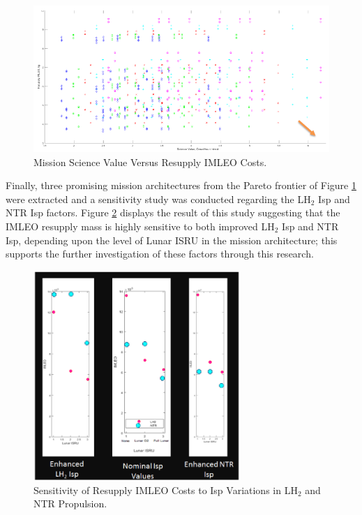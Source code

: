 \documentclass[]{aiaa-pretty}
\begin{document}
\begin{figure}[h!]
	\centering
	\includegraphics[width=\textwidth]{fulltrade}
	\caption{Mission Science Value Versus Resupply IMLEO Costs.}
	\label{fig:fulltrade}
\end{figure}

Finally, three promising mission architectures from the Pareto frontier of Figure \ref{fig:fulltrade} were extracted and a sensitivity study was conducted regarding  the LH$_2$ Isp and NTR Isp factors. Figure \ref{fig:senstrade} displays the result of this study suggesting that the IMLEO resupply mass is highly sensitive to both improved  LH$_2$ Isp and NTR Isp, depending upon the level of Lunar ISRU in the mission architecture; this supports the further investigation of these factors through this research.

\begin{figure}[ht!]
	\centering
	\includegraphics[width=0.7\textwidth]{improvetrade}
	\caption{Sensitivity of Resupply IMLEO Costs to Isp Variations in LH$_2$ and NTR Propulsion.}
	\label{fig:senstrade}
\end{figure}
\end{document}
